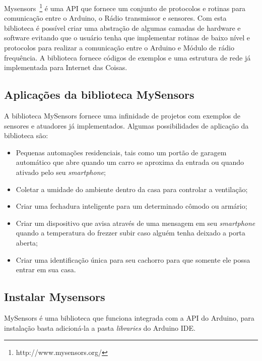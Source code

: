 Mysensors~\footnote{http://www.mysensors.org/} é uma API que fornece um conjunto de protocolos e rotinas para comunicação entre o Arduino, o Rádio transmissor e sensores. 
Com esta biblioteca é possível criar uma abstração de algumas camadas de hardware e software evitando que o usuário tenha que implementar rotinas de baixo nível e protocolos para realizar a comunicação entre o Arduino e Módulo de rádio frequência. A biblioteca fornece códigos de exemplos e uma estrutura de rede já implementada para Internet das Coisas. 

\subsection{Aplicações da biblioteca MySensors}

A biblioteca MySensors fornece uma infinidade de projetos com exemplos de sensores e atuadores já implementados. Algumas possibilidades de aplicação da biblioteca são:

\begin{itemize}
    \item Pequenas automações residenciais, tais como um portão de garagem automático que abre quando um carro se aproxima da entrada ou quando ativado pelo seu \textit{smartphone}; 

    \item Coletar a umidade do ambiente dentro da casa para controlar a ventilação;

    \item Criar uma fechadura inteligente para um determinado cômodo ou armário; 
    
    \item Criar um dispositivo que avisa através de uma mensagem em seu \textit{smartphone} quando a temperatura do frezzer subir caso alguém tenha deixado a porta aberta;

    \item Criar uma identificação única para seu cachorro para que somente ele possa entrar em sua casa.
\end{itemize}

\subsection{Instalar Mysensors}

MySensors é uma biblioteca que funciona integrada com a API do Arduino, para instalação basta adicioná-la a pasta \textit{libraries} do Arduino IDE.




